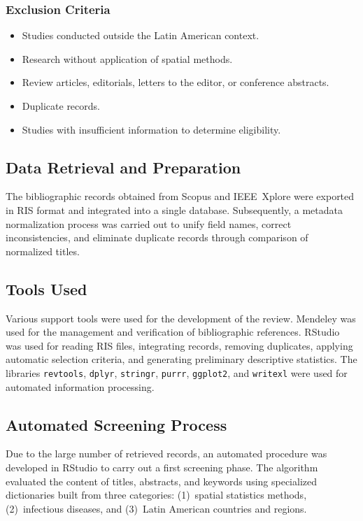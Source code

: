 \documentclass[runningheads]{llncs}
\begin{document}
\subsubsection{Exclusion Criteria}
\begin{itemize}
  \item Studies conducted outside the Latin American context.
  \item Research without application of spatial methods.
  \item Review articles, editorials, letters to the editor,
    or conference abstracts.
  \item Duplicate records.
  \item Studies with insufficient information to determine
    eligibility.
\end{itemize}

\subsection{Data Retrieval and Preparation}

The bibliographic records obtained from Scopus and
IEEE~Xplore were exported in RIS format and integrated into
a single database. Subsequently, a metadata normalization
process was carried out to unify field names, correct
inconsistencies, and eliminate duplicate records through
comparison of normalized titles.

\subsection{Tools Used}

Various support tools were used for the development of the
review. Mendeley was used for the management and verification
of bibliographic references. RStudio was used for reading RIS
files, integrating records, removing duplicates, applying
automatic selection criteria, and generating preliminary
descriptive statistics. The libraries \texttt{revtools},
\texttt{dplyr}, \texttt{stringr}, \texttt{purrr},
\texttt{ggplot2}, and \texttt{writexl} were used for
automated information processing.

\subsection{Automated Screening Process}

Due to the large number of retrieved records, an automated
procedure was developed in RStudio to carry out a first
screening phase. The algorithm evaluated the content of
titles, abstracts, and keywords using specialized
dictionaries built from three categories: (1)~spatial
statistics methods, (2)~infectious diseases, and
(3)~Latin American countries and regions.
\end{document}

